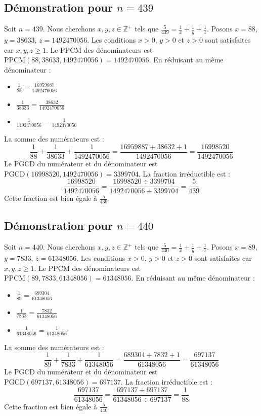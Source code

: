 \documentclass[11pt,a4paper]{article}
\begin{document}
\subsection{Démonstration pour $n = 439$}
Soit $n = 439$. Nous cherchons $x, y, z \in \mathbb{Z}^{+}$ tels que $\frac{5}{439} = \frac{1}{x} + \frac{1}{y} + \frac{1}{z}$.
Posons $x = 88$, $y = 38633$, $z = 1492470056$.
Les conditions $x > 0$, $y > 0$ et $z > 0$ sont satisfaites car $x, y, z \geq 1$.
Le PPCM des dénominateurs est $\text{PPCM}(88, 38633, 1492470056) = 1492470056$.
En réduisant au même dénominateur :
\begin{itemize}
    \item $\frac{1}{88} = \frac{16959887}{1492470056}$
    \item $\frac{1}{38633} = \frac{38632}{1492470056}$
    \item $\frac{1}{1492470056} = \frac{1}{1492470056}$
\end{itemize}
La somme des numérateurs est :
$$ \frac{1}{88} + \frac{1}{38633} + \frac{1}{1492470056} = \frac{16959887 + 38632 + 1}{1492470056} = \frac{16998520}{1492470056} $$
Le PGCD du numérateur et du dénominateur est $\text{PGCD}(16998520, 1492470056) = 3399704$.
La fraction irréductible est :
$$ \frac{16998520}{1492470056} = \frac{16998520 \div 3399704}{1492470056 \div 3399704} = \frac{5}{439} $$
Cette fraction est bien égale à $\frac{5}{439}$.

\subsection{Démonstration pour $n = 440$}
Soit $n = 440$. Nous cherchons $x, y, z \in \mathbb{Z}^{+}$ tels que $\frac{5}{440} = \frac{1}{x} + \frac{1}{y} + \frac{1}{z}$.
Posons $x = 89$, $y = 7833$, $z = 61348056$.
Les conditions $x > 0$, $y > 0$ et $z > 0$ sont satisfaites car $x, y, z \geq 1$.
Le PPCM des dénominateurs est $\text{PPCM}(89, 7833, 61348056) = 61348056$.
En réduisant au même dénominateur :
\begin{itemize}
    \item $\frac{1}{89} = \frac{689304}{61348056}$
    \item $\frac{1}{7833} = \frac{7832}{61348056}$
    \item $\frac{1}{61348056} = \frac{1}{61348056}$
\end{itemize}
La somme des numérateurs est :
$$ \frac{1}{89} + \frac{1}{7833} + \frac{1}{61348056} = \frac{689304 + 7832 + 1}{61348056} = \frac{697137}{61348056} $$
Le PGCD du numérateur et du dénominateur est $\text{PGCD}(697137, 61348056) = 697137$.
La fraction irréductible est :
$$ \frac{697137}{61348056} = \frac{697137 \div 697137}{61348056 \div 697137} = \frac{1}{88} $$
Cette fraction est bien égale à $\frac{5}{440}$.
\end{document}
